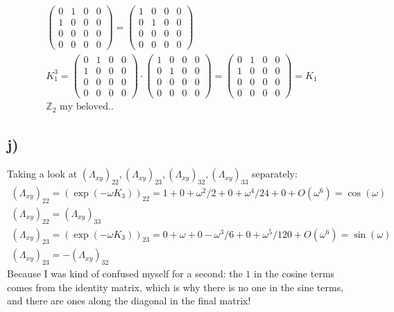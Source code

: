 \documentclass[]{scrartcl}
\begin{document}
\begin{gather*}
	\begin{pmatrix}
		0 & 1 & 0 & 0\\
		1 & 0 & 0 & 0\\
		0 & 0 & 0 & 0\\ 
		0 & 0 & 0 & 0
	\end{pmatrix} =
	\begin{pmatrix}
		1 & 0 & 0 & 0\\
		0 & 1 & 0 & 0\\
		0 & 0 & 0 & 0\\ 
		0 & 0 & 0 & 0
	\end{pmatrix}\\
	K_1^3 = \begin{pmatrix}
		0 & 1 & 0 & 0\\
		1 & 0 & 0 & 0\\
		0 & 0 & 0 & 0\\ 
		0 & 0 & 0 & 0
	\end{pmatrix} \cdot
	\begin{pmatrix}
		1 & 0 & 0 & 0\\
		0 & 1 & 0 & 0\\
		0 & 0 & 0 & 0\\ 
		0 & 0 & 0 & 0
	\end{pmatrix} = \begin{pmatrix}
		0 & 1 & 0 & 0\\
		1 & 0 & 0 & 0\\
		0 & 0 & 0 & 0\\ 
		0 & 0 & 0 & 0
	\end{pmatrix} = K_1\\
	\mathbb Z_2 \text{ my beloved..}
\end{gather*}

\subsection{j)}

Taking a look at $(\Lambda_{xy})_{22},(\Lambda_{xy})_{23}, (\Lambda_{xy})_{32}, (\Lambda_{xy})_{33}$ separately:
\begin{gather}
	(\Lambda_{xy})_{22} = \left(\exp(-\omega K_3)\right)_{22} = 1 + 0 + \omega^2/2 + 0 + \omega^4/24 + 0 + O(\omega^6) = \cos(\omega)\\
(\Lambda_{xy})_{22} = (\Lambda_{xy})_{33}\\
	(\Lambda_{xy})_{23} = \left(\exp(-\omega K_3)\right)_{23} = 0 + \omega + 0 - \omega^3/6 + 0 +\omega^5/120 + O(\omega^6) = \sin(\omega)\\
	(\Lambda_{xy})_{23} = -(\Lambda_{xy})_{32}
\end{gather}
Because I was kind of confused myself for a second: the $1$ in the cosine terms comes from the identity matrix, which is why there is no one in the sine terms, and there are ones along the diagonal in the final matrix!
\end{document}
